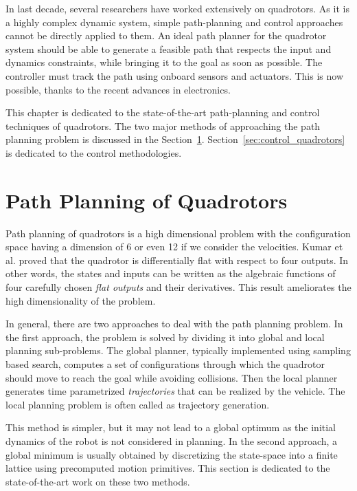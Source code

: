 In last decade, several researchers have worked extensively on quadrotors. As it is a highly complex dynamic system, simple path-planning and control approaches cannot be directly applied to them. An ideal path planner for the quadrotor system should be able to generate a feasible path that respects the input and dynamics constraints, while bringing it to the goal as soon as possible. The controller must track the path using onboard sensors and actuators. This is now possible, thanks to the recent advances in electronics.

This chapter is dedicated to the state-of-the-art path-planning and control techniques of quadrotors. The two major methods of approaching the path planning problem is discussed in the Section~\ref{sec:path_q}. Section~\ref{sec:control_quadrotors} is dedicated to the control methodologies. 

\section{Path Planning of Quadrotors}
\label{sec:path_q}
Path planning of quadrotors is a high dimensional problem with the configuration space having a dimension of 6 or even 12 if we consider the velocities. Kumar et al. \cite{mellinger2011minimum} proved that the quadrotor is differentially flat with respect to four outputs. In other words, the states and inputs can be written as the algebraic functions of four carefully chosen \textit{flat outputs} and their derivatives. This result ameliorates the high dimensionality of the problem.

In general, there are two approaches to deal with the path planning problem. In the first approach, the problem is solved by dividing it into global and local planning sub-problems. The global planner, typically implemented using sampling based search, computes a set of configurations through which the quadrotor should move to reach the goal while avoiding collisions. Then the local planner generates time parametrized \textit{trajectories} that can be realized by the vehicle. The local planning problem is often called as trajectory generation. 

This method is simpler, but it may not lead to a global optimum as the initial dynamics of the robot is not considered in planning. In the second approach, a global minimum is usually obtained by discretizing the state-space into a finite lattice using precomputed motion primitives. This section is dedicated to the state-of-the-art work on these two methods.

